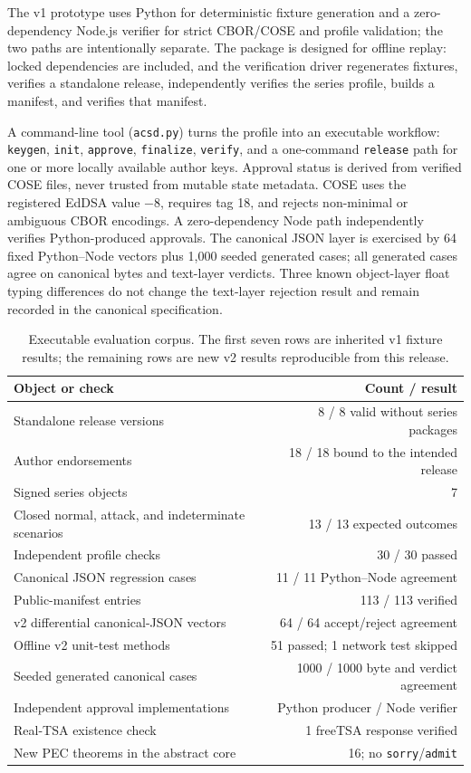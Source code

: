 \documentclass[11pt]{article}
\begin{document}
The v1 prototype uses Python for deterministic fixture generation and a zero-dependency Node.js verifier for strict CBOR/COSE and profile validation; the two paths are intentionally separate. The package is designed for offline replay: locked dependencies are included, and the verification driver regenerates fixtures, verifies a standalone release, independently verifies the series profile, builds a manifest, and verifies that manifest.

A command-line tool (\texttt{acsd.py}) turns the profile into an executable workflow: \texttt{keygen}, \texttt{init}, \texttt{approve}, \texttt{finalize}, \texttt{verify}, and a one-command \texttt{release} path for one or more locally available author keys. Approval status is derived from verified COSE files, never trusted from mutable state metadata. COSE uses the registered EdDSA value $-8$, requires tag 18, and rejects non-minimal or ambiguous CBOR encodings. A zero-dependency Node path independently verifies Python-produced approvals. The canonical JSON layer is exercised by 64 fixed Python--Node vectors plus 1,000 seeded generated cases; all generated cases agree on canonical bytes and text-layer verdicts. Three known object-layer float typing differences do not change the text-layer rejection result and remain recorded in the canonical specification.

\begin{table}[t]
\centering
\caption{Executable evaluation corpus. The first seven rows are inherited v1 fixture results; the remaining rows are new v2 results reproducible from this release.}
\begin{tabular}{lr}
\toprule
Object or check & Count / result \\
\midrule
Standalone release versions & 8 / 8 valid without series packages \\
Author endorsements & 18 / 18 bound to the intended release \\
Signed series objects & 7 \\
Closed normal, attack, and indeterminate scenarios & 13 / 13 expected outcomes \\
Independent profile checks & 30 / 30 passed \\
Canonical JSON regression cases & 11 / 11 Python--Node agreement \\
Public-manifest entries & 113 / 113 verified \\
v2 differential canonical-JSON vectors & 64 / 64 accept/reject agreement \\
Offline v2 unit-test methods & 51 passed; 1 network test skipped \\
Seeded generated canonical cases & 1000 / 1000 byte and verdict agreement \\
Independent approval implementations & Python producer / Node verifier \\
Real-TSA existence check & 1 freeTSA response verified \\
New PEC theorems in the abstract core & 16; no \texttt{sorry}/\texttt{admit} \\
\bottomrule
\end{tabular}
\end{table}
\end{document}
